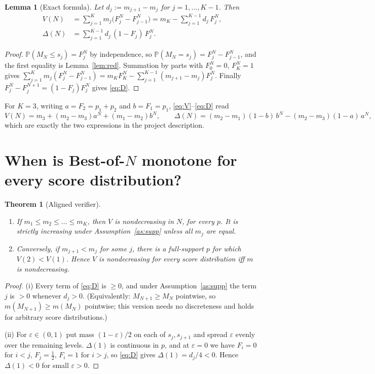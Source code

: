 \documentclass[11pt]{article}
\newtheorem{theorem}{Theorem}
\newtheorem{lemma}{Lemma}
\theoremstyle{definition}
\theoremstyle{remark}
\renewcommand{\Pr}{\mathbb{P}}
\begin{document}
\begin{lemma}[Exact formula]\label{lem:formula}
Let $d_j:=m_{j+1}-m_j$ for $j=1,\dots,K-1$. Then
\begin{align}
V(N)&=\sum_{j=1}^{K}m_j\bigl(F_j^{N}-F_{j-1}^{N}\bigr)
     = m_K-\sum_{j=1}^{K-1}d_j\,F_j^{N}, \label{eq:V}\\
\Delta(N)&=\sum_{j=1}^{K-1}d_j\,(1-F_j)\,F_j^{N}. \label{eq:D}
\end{align}
\end{lemma}

\begin{proof}
$\Pr(M_N\le s_j)=F_j^N$ by independence, so $\Pr(M_N=s_j)=F_j^N-F_{j-1}^N$, and the first
equality is Lemma~\ref{lem:red}. Summation by parts with $F_0^N=0$, $F_K^N=1$ gives
$\sum_{j=1}^K m_j(F_j^N-F_{j-1}^N)=m_K F_K^N-\sum_{j=1}^{K-1}(m_{j+1}-m_j)F_j^N$.
Finally $F_j^{N}-F_j^{N+1}=(1-F_j)F_j^{N}$ gives \eqref{eq:D}.
\end{proof}

For $K=3$, writing $a=F_2=p_1+p_2$ and $b=F_1=p_1$, \eqref{eq:V}--\eqref{eq:D} read
\begin{equation}\label{eq:three}
V(N)=m_3+(m_2-m_3)a^N+(m_1-m_2)b^N,\qquad
\Delta(N)=(m_2-m_1)(1-b)\,b^N-(m_2-m_3)(1-a)\,a^N ,
\end{equation}
which are exactly the two expressions in the project description.

\section{When is Best-of-$N$ monotone for every score distribution?}

\begin{theorem}[Aligned verifier]\label{thm:aligned}
\begin{enumerate}[label=(\roman*)]
\item If $m_1\le m_2\le\dots\le m_K$, then $V$ is nondecreasing in $N$, for every $p$.
It is strictly increasing under Assumption~\ref{as:supp} unless all $m_j$ are equal.
\item Conversely, if $m_{j+1}<m_j$ for some $j$, there is a full-support $p$ for which
$V(2)<V(1)$. Hence $V$ is nondecreasing for every score distribution \emph{iff} $m$ is
nondecreasing.
\end{enumerate}
\end{theorem}

\begin{proof}
(i) Every term of \eqref{eq:D} is $\ge 0$, and under Assumption~\ref{as:supp} the term $j$
is $>0$ whenever $d_j>0$. (Equivalently: $M_{N+1}\ge M_N$ pointwise, so
$m(M_{N+1})\ge m(M_N)$ pointwise; this version needs no discreteness and holds for
arbitrary score distributions.)

(ii) For $\varepsilon\in(0,1)$ put mass $(1-\varepsilon)/2$ on each of $s_j,s_{j+1}$ and
spread $\varepsilon$ evenly over the remaining levels. $\Delta(1)$ is continuous in $p$, and
at $\varepsilon=0$ we have $F_i=0$ for $i<j$, $F_j=\tfrac12$, $F_i=1$ for $i>j$, so
\eqref{eq:D} gives $\Delta(1)=d_j/4<0$. Hence $\Delta(1)<0$ for small $\varepsilon>0$.
\end{proof}
\end{document}

